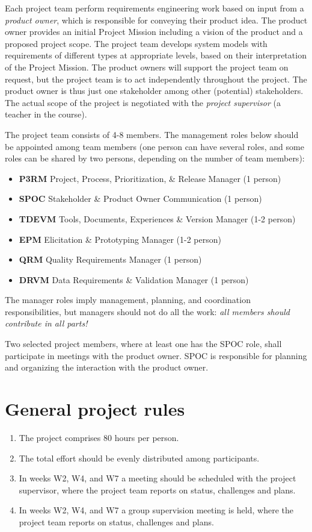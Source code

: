    \noindent Each project team perform requirements engineering work based on input from a \textit{product owner}, which is responsible for conveying their product idea. The product owner provides an initial Project Mission including a vision of the product and a proposed project scope. The project team develops system models with requirements of different types at appropriate levels, based on their interpretation of the Project Mission. The product owners will support the project team on request, but the project team is to act independently throughout the project. The product owner is thus just one stakeholder among other (potential) stakeholders. The actual scope of the project is negotiated with the \textit{project supervisor} (a teacher in the course).

The project team consists of 4-8 members. The management roles below should be appointed among team members (one person can have several roles, and some roles can be shared by two persons, depending on the number of team members):

   \begin{itemize}[noitemsep]
   \item \textbf{P3RM} Project, Process, Prioritization, \& Release Manager (1 person)
   \item \textbf{SPOC} Stakeholder \& Product Owner Communication (1 person)
   \item \textbf{TDEVM} Tools, Documents, Experiences \& Version Manager (1-2 person)
   \item \textbf{EPM} Elicitation \& Prototyping Manager (1-2 person)
   \item \textbf{QRM} Quality Requirements Manager (1 person)
   \item \textbf{DRVM} Data Requirements \& Validation Manager (1 person)
   \end{itemize}

   \noindent The manager roles imply management, planning, and coordination responsibilities, but managers should not do all the work: {\it all members should contribute in all parts!}

   Two selected project members, where at least one has the SPOC role, shall participate in meetings with the product owner. SPOC is responsible for planning and organizing the interaction with the product owner.
\fi 

\section{General project rules}
\begin{enumerate}[nolistsep]
\item The project comprises 80 hours per person.
\item The total effort should be evenly distributed among participants.
\ifteknolog
   \item In weeks W2, W4, and W7 a meeting should be scheduled with the project supervisor, where the project team reports on status, challenges and plans.
 \else
 \item In weeks W2, W4, and W7 a group supervision meeting is held, where the project team reports on status, challenges and plans.
 \fi
\end{enumerate}

